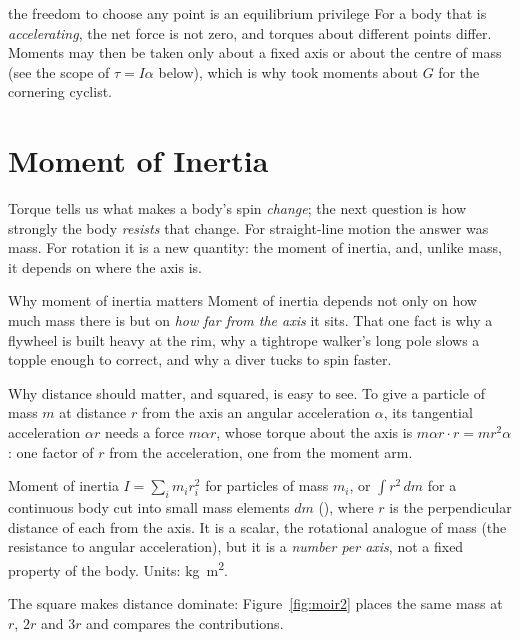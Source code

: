 \begin{trapbox}{the freedom to choose any point is an equilibrium privilege}
For a body that is \emph{accelerating}, the net force is not zero, and torques about different points
differ. Moments may then be taken only about a fixed axis or about the centre of mass (see the scope of
$\tau=I\alpha$ below), which is why  took moments about $G$ for the cornering cyclist.
\end{trapbox}

\section{Moment of Inertia}

Torque tells us what makes a body's spin \emph{change}; the next question is how strongly the body
\emph{resists} that change. For straight-line motion the answer was mass. For rotation it is a new
quantity: the moment of inertia, and, unlike mass, it depends on where the axis is.

\begin{motivbox}{Why moment of inertia matters}
Moment of inertia depends not only on how much mass there is but on \emph{how far from the axis} it sits. That one fact
is why a flywheel is built heavy at the rim, why a tightrope walker's long pole slows a topple enough to
correct, and why a diver tucks to spin faster.
\end{motivbox}

Why distance should matter, and squared, is easy to see. To give a particle of mass $m$ at distance $r$
from the axis an angular acceleration $\alpha$, its tangential acceleration $\alpha r$ needs a force
$m\alpha r$, whose torque about the axis is $m\alpha r\cdot r=mr^2\alpha$: one factor of $r$ from the
acceleration, one from the moment arm.

\begin{defbox}{Moment of inertia}
$I=\sum_i m_i r_i^2$ for particles of mass $m_i$, or $\int r^2\,dm$ for a continuous body cut into small
mass elements $dm$ (), where $r$ is the perpendicular distance of each from the axis. It is a
scalar, the rotational analogue of mass (the resistance to angular acceleration), but it is a
\emph{number per axis}, not a fixed property of the body. Units: \si{kg.m^2}.
\end{defbox}

The square makes distance dominate: Figure~\ref{fig:moir2} places the same mass at $r$, $2r$ and $3r$ and compares the contributions.

